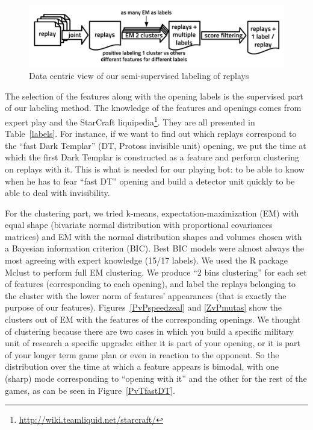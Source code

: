 \begin{figure}[htp]
\centerline{\includegraphics[width=0.76\columnwidth]{images/replays_labeling.pdf}}
\caption{Data centric view of our semi-supervised labeling of replays}
\label{replays_labeling}
\end{figure}

The selection of the features along with the opening labels is the supervised part of our labeling method. The knowledge of the features and openings comes from expert play and the StarCraft liquipedia\footnote{\url{http://wiki.teamliquid.net/starcraft/}}. They are all presented in Table~\ref{labels}. For instance, if we want to find out which replays correspond to the ``fast Dark Templar'' (DT, Protoss invisible unit) opening, we put the time at which the first Dark Templar is constructed as a feature and perform clustering on replays with it. This is what is needed for our playing bot: to be able to know when he has to fear ``fast DT'' opening and build a detector unit quickly to be able to deal with invisibility.


For the clustering part, we tried k-means, expectation-maximization (EM) with equal shape (bivariate normal distribution with proportional covariances matrices) and EM with the normal distribution shapes and volumes chosen with a Bayesian information criterion (BIC). Best BIC models were almost always the most agreeing with expert knowledge (15/17 labels). We used the R package Mclust \citep{Mclust,Mclust2} to perform full EM clustering. We produce ``2 bins clustering'' for each set of features (corresponding to each opening), and label the replays belonging to the cluster with the lower norm of features' appearances (that is exactly the purpose of our features). Figures~\ref{PvPspeedzeal} %
and \ref{ZvPmutas} show the clusters out of EM with the features of the corresponding openings. We thought of clustering because there are two cases in which you build a specific military unit of research a specific upgrade: either it is part of your opening, or it is part of your longer term game plan or even in reaction to the opponent. So the distribution over the time at which a feature appears is bimodal, with one (sharp) mode corresponding to ``opening with it'' and the other for the rest of the games, as can be seen in Figure~\ref{PvTfastDT}.

